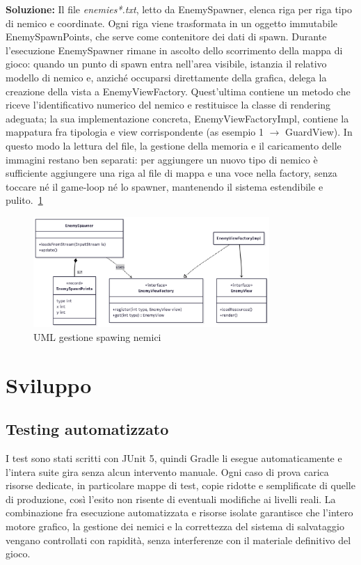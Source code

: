 \documentclass[a4paper,12pt]{report}
\begin{document}
\textbf{Soluzione:} Il file \emph{enemies*.txt}, letto da EnemySpawner, elenca riga per riga tipo di nemico e coordinate. 
Ogni riga viene trasformata in un oggetto immutabile EnemySpawnPoints, che serve come contenitore dei dati di spawn. Durante 
l'esecuzione EnemySpawner rimane in ascolto dello scorrimento della mappa di gioco: quando un punto di spawn entra nell'area visibile, 
istanzia il relativo modello di nemico e, anziché occuparsi direttamente della grafica, delega la creazione della vista a EnemyViewFactory. 
Quest'ultima contiene un metodo che riceve l'identificativo numerico del nemico e restituisce la classe di rendering adeguata; 
la sua implementazione concreta, EnemyViewFactoryImpl, contiene la mappatura fra tipologia e view corrispondente (as esempio 1 $\rightarrow$ GuardView).
In questo modo la lettura del file, la gestione della memoria e il caricamento delle immagini restano ben separati: per aggiungere un 
nuovo tipo di nemico è sufficiente aggiungere una riga al file di mappa e una voce nella factory, senza toccare né il game‑loop né lo 
spawner, mantenendo il sistema estendibile e pulito.~\ref{fig:2.11}
\begin{figure}
    \centering
    \includegraphics*[width=0.8\textwidth]{resources/spawingEnemyUML.png}
    \caption{UML gestione spawing nemici}
    \label{fig:2.11}
\end{figure}
\chapter{Sviluppo}
\section{Testing automatizzato}
I test sono stati scritti con JUnit 5, quindi Gradle li esegue automaticamente e l'intera suite gira senza alcun intervento manuale.
Ogni caso di prova carica risorse dedicate, in particolare mappe di test, copie ridotte e semplificate di quelle di produzione, così
l'esito non risente di eventuali modifiche ai livelli reali. La combinazione fra esecuzione automatizzata e risorse isolate garantisce 
che l'intero motore grafico, la gestione dei nemici e la correttezza del sistema di salvataggio vengano controllati con rapidità, 
senza interferenze con il materiale definitivo del gioco.
\end{document}

